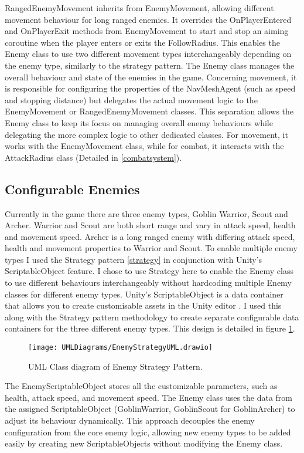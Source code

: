 \documentclass[10pt]{final_report}
\begin{document}
RangedEnemyMovement inherits from EnemyMovement, allowing different movement behaviour for long ranged enemies. It overrides the OnPlayerEntered and OnPlayerExit methods from EnemyMovement to start and stop an aiming coroutine when the player enters or exits the FollowRadius. This enables the Enemy class to use two different movement types interchangeably depending on the enemy type, similarly to the strategy pattern.
The Enemy class manages the overall behaviour and state of the enemies in the game. Concerning movement, it is responsible for configuring the properties of the NavMeshAgent (such as speed and stopping distance) but delegates the actual movement logic to the EnemyMovement or RangedEnemyMovement classes. This separation allows the Enemy class to keep its focus on managing overall enemy behaviours while delegating the more complex logic to other dedicated classes. For movement, it works with the EnemyMovement class, while for combat, it interacts with the AttackRadius class (Detailed in \ref{combatsystem}). 

\subsection{Configurable Enemies}
Currently in the game there are three enemy types, Goblin Warrior, Scout and Archer. Warrior and Scout are both  short range and vary in attack speed, health and movement speed. Archer is a long ranged enemy with differing attack speed, health and movement properties to Warrior and Scout. To enable multiple enemy types I used the Strategy pattern \ref{strategy} in conjunction with Unity's ScriptableObject feature. I chose to use Strategy here to enable the Enemy class to use different behaviours interchangeably without hardcoding multiple Enemy classes for different enemy types. Unity's ScriptableObject is a data container that allows you to create customisable assets in the Unity editor \cite{unity2024_ScriptableObject}. I used this along with the Strategy pattern methodology to create separate configurable data containers for the three different enemy types. This design is detailed in figure \ref{fig:label_strategy}.
\begin{figure}[H]
    \centering
    \texttt{[image: UMLDiagrams/EnemyStrategyUML.drawio]}
    \caption{UML Class diagram of Enemy Strategy Pattern.}
    \label{fig:label_strategy}
\end{figure}
The EnemyScriptableObject stores all the customizable parameters, such as health, attack speed, and movement speed. The Enemy class uses the data from the assigned ScriptableObject (GoblinWarrior, GoblinScout for GoblinArcher) to adjust its behaviour dynamically. This approach decouples the enemy configuration from the core enemy logic, allowing new enemy types to be added easily by creating new ScriptableObjects without modifying the Enemy class. 
\end{document}
